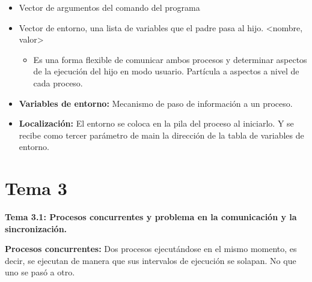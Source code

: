 \documentclass[12pt, twoside, openright]{report} %
\begin{document}
  \begin{itemize}
  \item Vector de argumentos del comando del programa
    
  \item Vector de entorno, una lista de variables que el padre pasa al hijo.
    \textless nombre, valor\textgreater{}
    

    \begin{itemize}
    \item Es una forma flexible de comunicar ambos procesos y determinar
      aspectos de la ejecución del hijo en modo usuario. Partícula a
      aspectos a nivel de cada proceso.
      
    \end{itemize}
  \end{itemize}

  \begin{itemize}
  \item \textbf{Variables de entorno:} Mecanismo de paso de información a un
    proceso.
    
  \item \textbf{Localización:} El entorno se coloca en la pila del proceso
    al iniciarlo. Y se recibe como tercer parámetro de main la dirección
    de la tabla de variables de entorno.
    
  \end{itemize}

\chapter{Tema 3}
\textbf{Tema 3.1: Procesos concurrentes y problema en la comunicación y
la sincronización.}

\textbf{Procesos concurrentes:} Dos procesos ejecutándose en el mismo
  momento, es decir, se ejecutan de manera que sus intervalos de
  ejecución se solapan. No que uno se pasó a otro.
  
\end{document}
